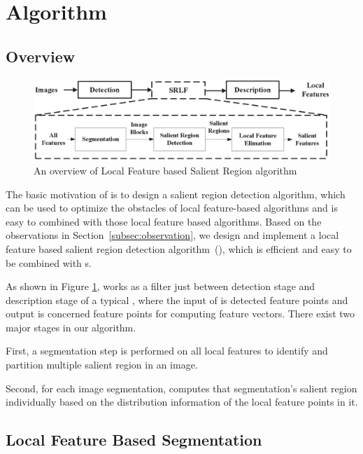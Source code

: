 \section{{\sys} Algorithm}
\label{sec:algorithm}

\subsection{Overview}
\label{sec:algorithm_overview}

\begin{figure}[!t]
\centering
\includegraphics[width=5.0in]{images/fig-overview.eps}
\caption{An overview of Local Feature based Salient Region algorithm}
\label{fig:overview}
\end{figure}

The basic motivation of {\sys} is to design a salient region detection algorithm, which can be used to optimize the obstacles of local feature-based algorithms and is easy to combined with those local feature based algorithms. Based on the observations in Section~\ref{subsec:observation}, we design and implement a local feature based salient region detection algorithm~({\sys}), which is efficient and easy to be combined with {\lfea}s.    

As shown in Figure \ref{fig:overview}, {\sys} works as a filter just between detection stage and description stage of a typical {\lfea}, where the input of {\sys} is detected feature points and output is concerned feature points for computing feature vectors. There exist two major stages in our algorithm.
\begin{inparaenum}
\item First, a segmentation step is performed on all local features to identify and partition multiple salient region in an image. 
\item Second, for each image segmentation, {\sys} computes that segmentation's salient region individually based on the distribution information of the local feature points in it.
\end{inparaenum}

\subsection{Local Feature Based Segmentation}
\label{sec:algorithm_segmentation}

